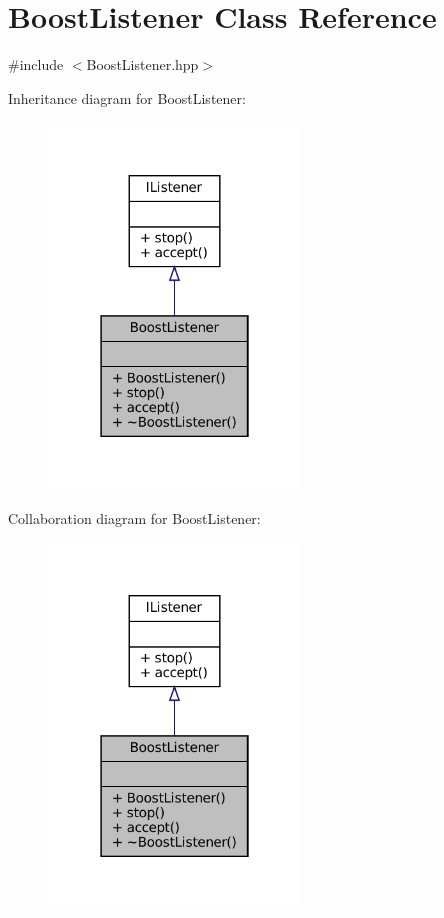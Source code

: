 \hypertarget{classBoostListener}{}\section{Boost\+Listener Class Reference}
\label{classBoostListener}


{\ttfamily \#include $<$Boost\+Listener.\+hpp$>$}



Inheritance diagram for Boost\+Listener\+:
\nopagebreak
\begin{figure}[H]
\begin{center}
\leavevmode
\includegraphics[width=190pt]{classBoostListener__inherit__graph}
\end{center}
\end{figure}


Collaboration diagram for Boost\+Listener\+:
\nopagebreak
\begin{figure}[H]
\begin{center}
\leavevmode
\includegraphics[width=190pt]{classBoostListener__coll__graph}
\end{center}
\end{figure}
